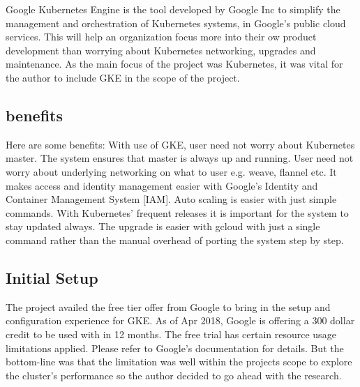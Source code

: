 Google Kubernetes Engine is the tool developed by Google Inc to simplify the 
management and orchestration of Kubernetes systems, in Google's public cloud
 services. This will help an organization focus more into their ow product 
 development than worrying about Kubernetes networking, upgrades and 
 maintenance. As the main focus of the project was Kubernetes, it
was vital for the author to include GKE in the scope of the project.

\subsection{benefits}

Here are some benefits: With use of GKE, user need not worry about Kubernetes
 master. The system ensures that master is always up and running. User need not
  worry about underlying networking on what to user e.g. weave, flannel etc. 
  It makes access and identity management easier with Google's Identity and 
  Container Management System [IAM]. Auto scaling is easier with just simple 
  commands. With Kubernetes' frequent releases it is important for the system 
to stay updated always. The upgrade is easier with gcloud with just a single 
command rather than the manual overhead of porting the system step by step.

\subsection{Initial Setup}
The project availed the free tier offer from Google to bring in the setup and 
configuration experience for GKE. As of Apr 2018, Google is offering a 300 
dollar credit to be used with in 12 months. The free trial has certain resource
usage limitations applied. Please refer to Google's documentation for details.
 But the bottom-line was that the limitation was well within the projects scope
  to explore the cluster's performance so the author decided to go ahead with 
  the research. 

